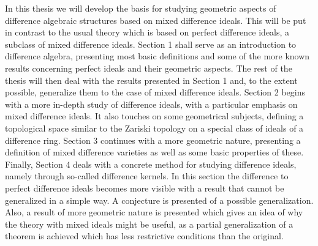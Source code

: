 In this thesis we will develop the basis for studying geometric aspects of difference algebraic structures based on mixed difference ideals. This will be put in contrast to the usual theory which is based on perfect difference ideals, a subclass of mixed difference ideals. Section 1 shall serve as an introduction to difference algebra, presenting most basic definitions and some of the more known results concerning perfect ideals and their geometric aspects.
The rest of the thesis will then deal with the results presented in Section 1 and, to the extent possible, generalize them to the case of mixed difference ideals. 
Section 2 begins with a more in-depth study of difference ideals, with a particular emphasis on mixed difference ideals. It also touches on some geometrical subjects, defining a topological space similar to the Zariski topology on a special class of ideals of a difference ring.
Section 3 continues with a more geometric nature, presenting a definition of mixed difference varieties as well as some basic properties of these. 
Finally, Section 4 deals with a concrete method for studying difference ideals, namely through so-called difference kernels. In this section the difference to perfect difference ideals becomes more visible with a result that cannot be generalized in a simple way. A conjecture is presented of a possible generalization. Also, a result of more geometric nature is presented which gives an idea of why the theory with mixed ideals might be useful,
as a partial generalization of a theorem is achieved which has less restrictive conditions than the original.
